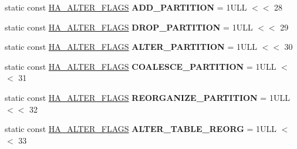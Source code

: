 \begin{DoxyCompactItemize}
\mbox{\label{classAlter__inplace__info_a39b286626ed96a9cdf1e473807ef528f}} 
static const \mbox{\hyperlink{classAlter__inplace__info_a45258f36b4942b5cabee7239463daaca}{H\+A\+\_\+\+A\+L\+T\+E\+R\+\_\+\+F\+L\+A\+GS}} {\bfseries A\+D\+D\+\_\+\+P\+A\+R\+T\+I\+T\+I\+ON} = 1\+U\+L\+L $<$$<$ 28
\item 
\mbox{\label{classAlter__inplace__info_a0d55ea9f597d0f2f7bf1d44a08860d40}} 
static const \mbox{\hyperlink{classAlter__inplace__info_a45258f36b4942b5cabee7239463daaca}{H\+A\+\_\+\+A\+L\+T\+E\+R\+\_\+\+F\+L\+A\+GS}} {\bfseries D\+R\+O\+P\+\_\+\+P\+A\+R\+T\+I\+T\+I\+ON} = 1\+U\+L\+L $<$$<$ 29
\item 
\mbox{\label{classAlter__inplace__info_aa5c2aca77ee1f958f428aa29f759f6d3}} 
static const \mbox{\hyperlink{classAlter__inplace__info_a45258f36b4942b5cabee7239463daaca}{H\+A\+\_\+\+A\+L\+T\+E\+R\+\_\+\+F\+L\+A\+GS}} {\bfseries A\+L\+T\+E\+R\+\_\+\+P\+A\+R\+T\+I\+T\+I\+ON} = 1\+U\+L\+L $<$$<$ 30
\item 
\mbox{\label{classAlter__inplace__info_a0213ab172f7b6705bd238ec3cff14386}} 
static const \mbox{\hyperlink{classAlter__inplace__info_a45258f36b4942b5cabee7239463daaca}{H\+A\+\_\+\+A\+L\+T\+E\+R\+\_\+\+F\+L\+A\+GS}} {\bfseries C\+O\+A\+L\+E\+S\+C\+E\+\_\+\+P\+A\+R\+T\+I\+T\+I\+ON} = 1\+U\+L\+L $<$$<$ 31
\item 
\mbox{\label{classAlter__inplace__info_a83bd66e67d3c577a97a9f8e0396f5dcb}} 
static const \mbox{\hyperlink{classAlter__inplace__info_a45258f36b4942b5cabee7239463daaca}{H\+A\+\_\+\+A\+L\+T\+E\+R\+\_\+\+F\+L\+A\+GS}} {\bfseries R\+E\+O\+R\+G\+A\+N\+I\+Z\+E\+\_\+\+P\+A\+R\+T\+I\+T\+I\+ON} = 1\+U\+L\+L $<$$<$ 32
\item 
\mbox{\label{classAlter__inplace__info_a2684ea9ef1c0ab512983423294864f33}} 
static const \mbox{\hyperlink{classAlter__inplace__info_a45258f36b4942b5cabee7239463daaca}{H\+A\+\_\+\+A\+L\+T\+E\+R\+\_\+\+F\+L\+A\+GS}} {\bfseries A\+L\+T\+E\+R\+\_\+\+T\+A\+B\+L\+E\+\_\+\+R\+E\+O\+RG} = 1\+U\+L\+L $<$$<$ 33
\item 
\mbox{\label{classAlter__inplace__info_a807dadf45c665e23b2049e3a2dfbe587}} 

\end{DoxyCompactItemize}
